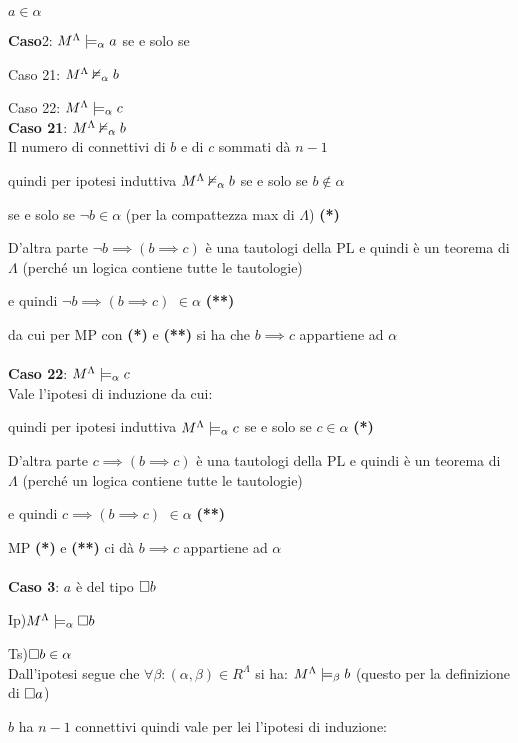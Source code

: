 $a\in\alpha$ 

\textbf{Caso}2:$ $ $M^{\Lambda}\models_{\alpha}a$ se e solo se

Caso 21: $M^{\Lambda}\nvDash_{\alpha}b$ 

Caso 22: $M^{\Lambda}\models_{\alpha}c$\\


\textbf{Caso 21}: $M^{\Lambda}\nvDash_{\alpha}b$ \\


Il numero di connettivi di $b$ e di $c$ sommati dà $n-1$

quindi per ipotesi induttiva $M^{\Lambda}\nvDash_{\alpha}b$ se e solo se
$b\notin\alpha$ 

se e solo se $\neg b\in\alpha$ (per la compattezza max di $\Lambda$)
\textbf{({*})}

D'altra parte $\neg b\implies(b\implies c)$ è una tautologi della
PL e quindi è un teorema di $\Lambda$ (perché un logica contiene
tutte le tautologie)

e quindi $\neg b\implies(b\implies c)$ $\in\alpha$ \textbf{({*}{*})}

da cui per MP con \textbf{({*})} e \textbf{({*}{*})} si ha che $b\implies c$
appartiene ad $\alpha$\\
\\
\textbf{Caso 22}: $M^{\Lambda}\models_{\alpha}c$\\


Vale l'ipotesi di induzione da cui:

quindi per ipotesi induttiva $M^{\Lambda}\models_{\alpha}c$ se e solo se $c\in\alpha$
\textbf{({*})}

D'altra parte $c\implies(b\implies c)$ è una tautologi della PL e
quindi è un teorema di $\Lambda$ (perché un logica contiene tutte
le tautologie)

e quindi $c\implies(b\implies c)$ $\in\alpha$ \textbf{({*}{*})}

MP \textbf{({*}) }e \textbf{({*}{*}) }ci dà $b\implies c$ appartiene
ad $\alpha$\\
\\
\textbf{Caso 3}: $a$ è del tipo $\square b$

Ip)$M^{\Lambda}\models_{\alpha}\square b$

Ts)$\square b\in\alpha$\\


Dall'ipotesi segue che $\forall\beta:(\alpha,\beta)\in R^{\Lambda}$
si ha: $M^{\Lambda}\models_{\beta}b$ (questo per la definizione di $\square a$)

$b$ ha $n-1$ connettivi quindi vale per lei l'ipotesi di induzione: 

